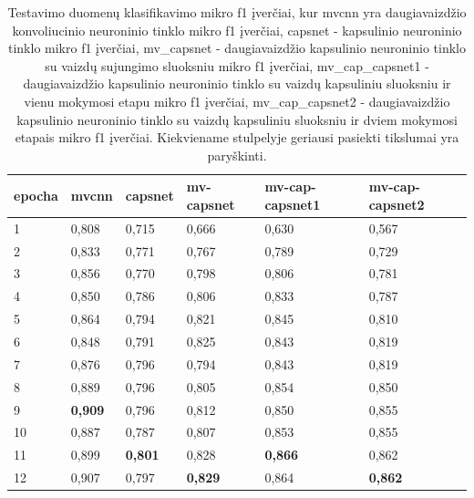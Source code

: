 \begin{table}[]
	\caption{
		Testavimo duomenų klasifikavimo mikro f1 įverčiai, kur mvcnn yra daugiavaizdžio konvoliucinio neuroninio tinklo mikro f1 įverčiai, capsnet - kapsulinio neuroninio tinklo mikro f1 įverčiai, mv\_capsnet - daugiavaizdžio kapsulinio neuroninio tinklo su vaizdų sujungimo sluoksniu mikro f1 įverčiai, mv\_cap\_capsnet1 - daugiavaizdžio kapsulinio neuroninio tinklo su vaizdų kapsuliniu sluoksniu ir vienu mokymosi etapu mikro f1 įverčiai, mv\_cap\_capsnet2 - daugiavaizdžio kapsulinio neuroninio tinklo su vaizdų kapsuliniu sluoksniu ir dviem mokymosi etapais mikro f1 įverčiai. Kiekviename stulpelyje geriausi pasiekti tikslumai yra paryškinti.
	}
	\begin{tabular}{l|l|l|l|l|l}
		epocha & mvcnn & capsnet & mv-capsnet & mv-cap-capsnet1 & mv-cap-capsnet2 \\
		\hline
		1 & 0,808 &   0,715 &      0,666 &           0,630 &           0,567 \\
		2 & 0,833 &   0,771 &      0,767 &           0,789 &           0,729 \\
		3 & 0,856 &   0,770 &      0,798 &           0,806 &           0,781 \\
		4 & 0,850 &   0,786 &      0,806 &           0,833 &           0,787 \\
		5 & 0,864 &   0,794 &      0,821 &           0,845 &           0,810 \\
		6 & 0,848 &   0,791 &      0,825 &           0,843 &           0,819 \\
		7 & 0,876 &   0,796 &      0,794 &           0,843 &           0,819 \\
		8 & 0,889 &   0,796 &      0,805 &           0,854 &           0,850 \\
		9 & \textbf{0,909} &   0,796 &      0,812 &           0,850 &           0,855 \\
		10 & 0,887 &   0,787 &      0,807 &           0,853 &           0,855 \\
		11 & 0,899 &  \textbf{ 0,801} &      0,828 &           \textbf{0,866} &           0,862 \\
		12 & 0,907 &   0,797 &      \textbf{0,829} &           0,864 &           \textbf{0,862} \\
	\end{tabular}
	\label{tbl:micro_f1}
\end{table}

